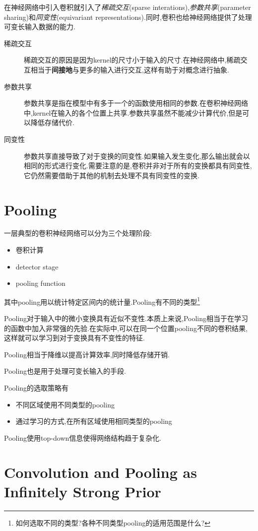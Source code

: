 在神经网络中引入卷积就引入了\textit{稀疏交互}(sparse interations),\textit{参数共享}(parameter sharing)和\textit{同变性}(equivariant representations).同时,卷积也给神经网络提供了处理可变长输入数据的能力.
\begin{description}
    \item [稀疏交互]
    稀疏交互的原因是因为kernel的尺寸小于输入的尺寸.在神经网络中,稀疏交互相当于\textbf{间接地}与更多的输入进行交互,这样有助于对概念进行抽象.
    \item [参数共享]
    参数共享是指在模型中有多于一个的函数使用相同的参数.在卷积神经网络中,kernel在输入的各个位置上共享.参数共享虽然不能减少计算代价,但是可以降低存储代价.
    \item [同变性]
    参数共享直接导致了对于变换的同变性.如果输入发生变化,那么输出就会以相同的形式进行变化.需要注意的是,卷积并非对于所有的变换都具有同变性,它仍然需要借助于其他的机制去处理不具有同变性的变换.
\end{description}

\section{Pooling}

一层典型的卷积神经网络可以分为三个处理阶段:
\begin{itemize}
    \item 卷积计算
    \item detector stage
    \item pooling function
\end{itemize}
其中pooling用以统计特定区间内的统计量.Pooling有不同的类型\footnote{如何选取不同的类型?各种不同类型pooling的适用范围是什么?}

Pooling对于输入中的微小变换具有近似不变性.本质上来说,Pooling相当于在学习的函数中加入非常强的先验.在实际中,可以在同一个位置pooling不同的卷积结果,这样就可以学习到对于变换具有不变性的特征.

Pooling相当于降维以提高计算效率,同时降低存储开销.

Pooling也是用于处理可变长输入的手段.

Pooling的选取策略有
\begin{itemize}
    \item 不同区域使用不同类型的pooling
    \item 通过学习的方式,在所有区域使用相同类型的pooling
\end{itemize}

Pooling使用top-down信息使得网络结构趋于复杂化.

\section{Convolution and Pooling as Infinitely Strong Prior}

